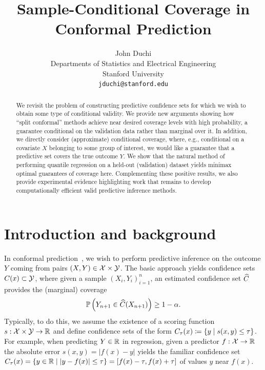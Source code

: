 \documentclass{article}
\title{Sample-Conditional Coverage in Conformal Prediction}
\author{John Duchi \\
  Departments of Statistics and Electrical Engineering \\
  Stanford University \\
  \texttt{jduchi@stanford.edu}
}
\newcommand{\scorefunc}{s}
\begin{document}
\maketitle

\begin{abstract}
  We revisit the problem of constructing predictive confidence sets
  for which we wish to obtain some type of conditional
  validity.
  We provide new arguments showing how ``split conformal'' methods
  achieve near desired coverage levels with high probability, a
  guarantee conditional on the validation data rather than
  marginal over it.
  In addition, we directly consider (approximate) conditional coverage,
  where, e.g., conditional on a covariate $X$ belonging to some
  group of interest, we would like a guarantee that a predictive set
  covers the true outcome $Y$.
  We show that the natural method of performing quantile regression on a
  held-out (validation) dataset yields minimax optimal guarantees of
  coverage here.
  Complementing these positive results, we also provide experimental
  evidence highlighting work that remains to develop
  computationally efficient valid predictive inference methods.
\end{abstract}

\section{Introduction and background}

In conformal
prediction~\cite{VovkGaSh05,LeiWa14,LeiGSRiTiWa18,BarberCaRaTi21a}, we wish
to perform predictive inference on the outcome $Y$ coming from pairs $(X, Y)
\in \mathcal{X} \times \mathcal{Y}$.
%
The basic approach yields confidence sets $C(x) \subset \mathcal{Y}$, where given
a sample $(X_i, Y_i)_{i = 1}^n$, an estimated confidence set
$\widehat{C}$ provides the (marginal) coverage
\begin{equation}
  \label{eqn:marginal-guarantee}
  \mathbb{P}\left(Y_{n + 1} \in \widehat{C}(X_{n + 1})\right) \ge 1 - \alpha.
\end{equation}
%
Typically, to do this, we assume the existence of a scoring function
$\scorefunc : \mc{X} \times \mc{Y} \to \R$ and define confidence sets
of the form $C_\tau(x) \defeq \{y \mid \scorefunc(x, y) \le \tau\}$.
%
For example, when predicting $Y \in \mathbb{R}$ in regression, given a
predictor $f : \mathcal{X} \to \mathbb{R}$ the absolute error $\scorefunc(x, y) =
|f(x) - y|$ yields the familiar confidence set $C_\tau(x) = \{y \in \mathbb{R} \mid
|y - f(x)| \le \tau\} = [f(x) - \tau, f(x) + \tau]$ of values $y$ near
$f(x)$.
\end{document}
